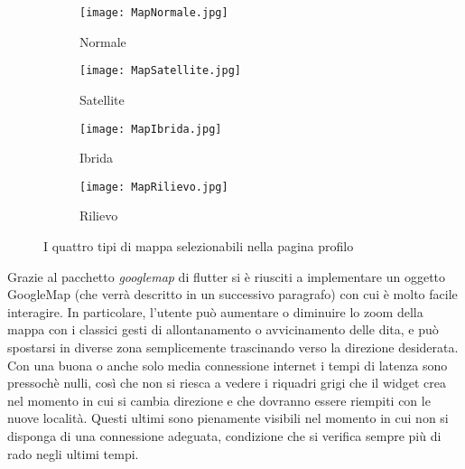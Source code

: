 \begin{figure}[h!]
    \centering
    \begin{subfigure}{0.33\linewidth}
        \texttt{[image: MapNormale.jpg]}
        \caption{Normale}
    \end{subfigure}
    \begin{subfigure}{0.33\linewidth}
        \texttt{[image: MapSatellite.jpg]}
        \caption{Satellite}
    \end{subfigure}
    \begin{subfigure}{0.33\linewidth}
        \texttt{[image: MapIbrida.jpg]}
        \caption{Ibrida}
    \end{subfigure}
    \begin{subfigure}{0.33\linewidth}
        \texttt{[image: MapRilievo.jpg]}
        \caption{Rilievo}
    \end{subfigure}
    \caption{I quattro tipi di mappa selezionabili nella pagina profilo}
    \label{TipoMappa}
\end{figure} 

Grazie al pacchetto \textit{googlemap} di flutter si è riusciti a implementare un oggetto
GoogleMap (che verrà descritto in un successivo paragrafo) con cui è molto
facile interagire. In particolare, l'utente può aumentare o diminuire lo zoom
della mappa con i classici gesti di allontanamento o avvicinamento delle dita, e
può spostarsi in diverse zona semplicemente trascinando verso la direzione
desiderata. Con una buona o anche solo media connessione internet i tempi di
latenza sono pressochè nulli, così che non si riesca a vedere i riquadri grigi
che il widget crea nel momento in cui si cambia direzione e che dovranno essere
riempiti con le nuove località. Questi ultimi sono pienamente visibili nel
momento in cui non si disponga di una connessione adeguata, condizione che si
verifica sempre più di rado negli ultimi tempi. 


